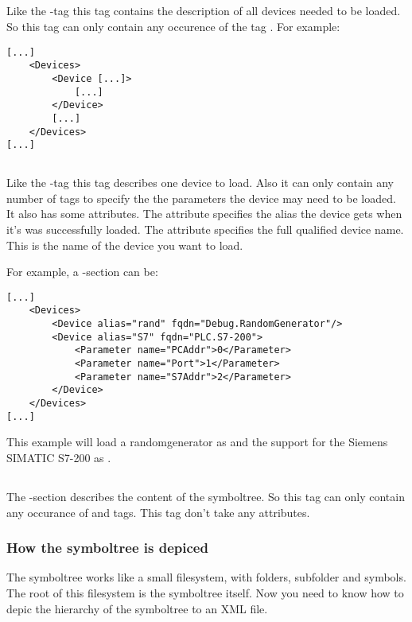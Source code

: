 \subsection{}
Like the -tag this tag contains the description of
all devices needed to be loaded. So this tag can only contain any
occurence of the tag . For example:
\begin{verbatim}
[...]
    <Devices>
        <Device [...]>
            [...]
        </Device>
        [...]
    </Devices>
[...]
\end{verbatim}


\subsection{}
Like the -tag this tag describes one device to load. Also it can only contain 
any number of  tags to specify the the parameters the device may need to be
loaded. It also has some attributes. The attribute  specifies the alias the device 
gets when it's was successfully loaded. The attribute  specifies the full qualified 
device name. This is the name of the device you want to load.

For example, a -section can be:
\begin{verbatim}
[...]
    <Devices>
        <Device alias="rand" fqdn="Debug.RandomGenerator"/>
        <Device alias="S7" fqdn="PLC.S7-200">
            <Parameter name="PCAddr">0</Parameter>
            <Parameter name="Port">1</Parameter>
            <Parameter name="S7Addr">2</Parameter>
        </Device>
    </Devices>
[...]
\end{verbatim}
This example will load a randomgenerator as   and the support for the Siemens SIMATIC S7-200 
as .


\subsection{}
The -section describes the content of the symboltree. So this tag can only contain
any occurance of  and  tags. This tag don't take any attributes.

\subsubsection{How the symboltree is depiced}
The symboltree works like a small filesystem, with folders, subfolder and symbols. The root of this filesystem is the
symboltree itself. Now you need to know how to depic the hierarchy of the symboltree to an XML file.

